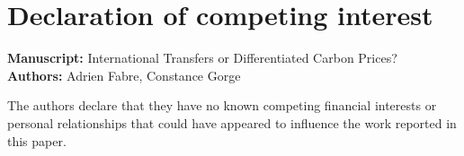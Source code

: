 \documentclass[12pt]{article}
\begin{document}
\section*{Declaration of competing interest}
\noindent\textbf{Manuscript:} International Transfers or Differentiated Carbon Prices?\\
\textbf{Authors:} Adrien Fabre, Constance Gorge

\bigskip
\noindent The authors declare that they have no known competing financial interests or personal relationships that could have appeared to influence the work reported in this paper.
\end{document}
